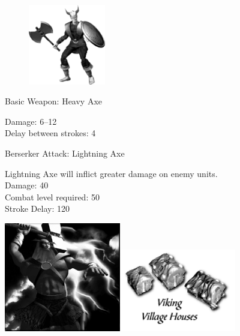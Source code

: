 \begin{figure}
	\begin{center}
		\vspace{-20pt}
		\includegraphics[width=0.3\textwidth]{Aviking}
	\end{center}
	\vspace{-20pt}
\end{figure}

Basic Weapon: Heavy Axe
\begin{changemargin}{.5cm}{0cm}
	Damage: 6–12 \\
	Delay between strokes: 4
\end{changemargin}
Berserker Attack: Lightning Axe
\begin{changemargin}{.5cm}{0cm}
	Lightning Axe will inflict greater damage on enemy units. \\
	Damage: 40 \\
	Combat level required: 50 \\
	Stroke Delay: 120 
\end{changemargin}

\begin{center}
	\includegraphics[width=2in]{Athor}\hspace{1pt}\includegraphics[width=2in]{Ivikinghouse}
\end{center}

